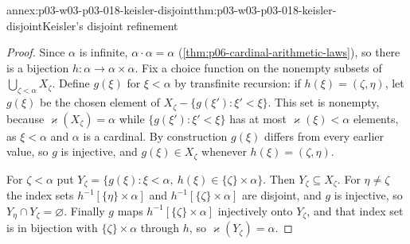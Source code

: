 \begin{annexitem}{annex:p03-w03-p03-018-keisler-disjoint}{thm:p03-w03-p03-018-keisler-disjoint}{Keisler's disjoint refinement}
\begin{proof}
Since \(\alpha\) is infinite, \(\alpha\cdot\alpha=\alpha\)
(\cref{thm:p06-cardinal-arithmetic-laws}), so there is a bijection
\(h:\alpha\to\alpha\times\alpha\).  Fix a choice function on the nonempty
subsets of \(\bigcup_{\zeta<\alpha}X_\zeta\).  Define \(g(\xi)\) for
\(\xi<\alpha\) by transfinite recursion: if \(h(\xi)=(\zeta,\eta)\), let
\(g(\xi)\) be the chosen element of
\(X_\zeta-\{g(\xi'):\xi'<\xi\}\).  This set is nonempty, because
\(\varkappa(X_\zeta)=\alpha\) while \(\{g(\xi'):\xi'<\xi\}\) has at most
\(\varkappa(\xi)<\alpha\) elements, as \(\xi<\alpha\) and \(\alpha\) is a
cardinal.  By construction \(g(\xi)\) differs from every earlier value, so
\(g\) is injective, and \(g(\xi)\in X_\zeta\) whenever
\(h(\xi)=(\zeta,\eta)\).

For \(\zeta<\alpha\) put
\(Y_\zeta=\{g(\xi):\xi<\alpha,\ h(\xi)\in\{\zeta\}\times\alpha\}\).  Then
\(Y_\zeta\subseteq X_\zeta\).  For \(\eta\ne\zeta\) the index sets
\(h^{-1}[\{\eta\}\times\alpha]\) and \(h^{-1}[\{\zeta\}\times\alpha]\) are
disjoint, and \(g\) is injective, so \(Y_\eta\cap Y_\zeta=\varnothing\).
Finally \(g\) maps \(h^{-1}[\{\zeta\}\times\alpha]\) injectively onto
\(Y_\zeta\), and that index set is in bijection with
\(\{\zeta\}\times\alpha\) through \(h\), so \(\varkappa(Y_\zeta)=\alpha\).
\end{proof}
\end{annexitem}

